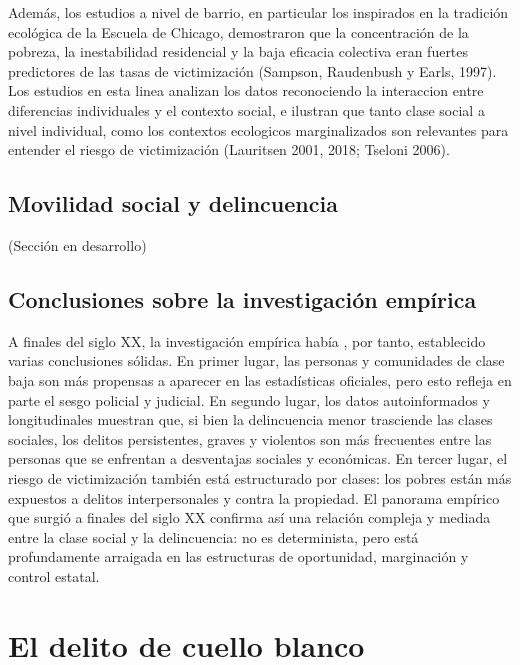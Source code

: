 \documentclass[
  spanish,
  letterpaper,
  DIV=11,
  numbers=noendperiod]{scrreprt}
\begin{document}
Además, los estudios a nivel de barrio, en particular los inspirados en
la tradición ecológica de la Escuela de Chicago, demostraron que la
concentración de la pobreza, la inestabilidad residencial y la baja
eficacia colectiva eran fuertes predictores de las tasas de
victimización (Sampson, Raudenbush y Earls, 1997). Los estudios en esta
linea analizan los datos reconociendo la interaccion entre diferencias
individuales y el contexto social, e ilustran que tanto clase social a
nivel individual, como los contextos ecologicos marginalizados son
relevantes para entender el riesgo de victimización (Lauritsen 2001,
2018; Tseloni 2006).

\subsection{Movilidad social y
delincuencia}\label{movilidad-social-y-delincuencia}

(Sección en desarrollo)

\subsection{Conclusiones sobre la investigación
empírica}\label{conclusiones-sobre-la-investigaciuxf3n-empuxedrica}

A finales del siglo XX, la investigación empírica había , por tanto,
establecido varias conclusiones sólidas. En primer lugar, las personas y
comunidades de clase baja son más propensas a aparecer en las
estadísticas oficiales, pero esto refleja en parte el sesgo policial y
judicial. En segundo lugar, los datos autoinformados y longitudinales
muestran que, si bien la delincuencia menor trasciende las clases
sociales, los delitos persistentes, graves y violentos son más
frecuentes entre las personas que se enfrentan a desventajas sociales y
económicas. En tercer lugar, el riesgo de victimización también está
estructurado por clases: los pobres están más expuestos a delitos
interpersonales y contra la propiedad. El panorama empírico que surgió a
finales del siglo XX confirma así una relación compleja y mediada entre
la clase social y la delincuencia: no es determinista, pero está
profundamente arraigada en las estructuras de oportunidad, marginación y
control estatal.

\section{El delito de cuello blanco}\label{el-delito-de-cuello-blanco}
\end{document}
